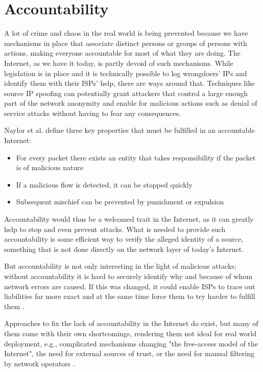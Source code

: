 \documentclass{acm_proc_article-sp}
\begin{document}

\section{Accountability}
\label{sec:acc}
A lot of crime and chaos in the real world is being prevented because we have mechanisms in place that associate distinct persons or groups of persons with actions, making everyone accountable for most of what they are doing. The Internet, as we have it today, is partly devoid of such mechanisms. While legislation is in place and it is technically possible to log wrongdoers' IPs and identify them with their ISPs' help, there are ways around that. Techniques like source IP spoofing can potentially grant attackers that control a large enough part of the network anonymity and enable for malicious actions such as denial of service attacks without having to fear any consequences.

Naylor et al. \cite{apip} define three key properties that must be fulfilled in an accountable Internet:

\begin{itemize}
\item For every packet there exists an entity that takes responsibility if the packet is of malicious nature
\item If a malicious flow is detected, it can be stopped quickly
\item Subsequent mischief can be prevented by punishment or expulsion
\end{itemize}

Accountability would thus be a welcomed trait in the Internet, as it can greatly help to stop and even prevent attacks. What is needed to provide such accountability is some efficient way to verify the alleged identity of a source, something that is not done directly on the network layer of today's Internet. 

But accountability is not only interesting in the light of malicious attacks; without accountability it is hard to securely identify why and because of whom network errors are caused. If this was changed, it could enable ISPs to trace out liabilities far more exact and at the same time force them to try harder to fulfill them \cite{mot}. 

Approaches to fix the lack of accountability in the Internet do exist, but many of them come with their own shortcomings, rendering them not ideal for real world deployment, e.g., complicated mechanisms changing "the free-access model of the Internet", the need for external sources of trust, or the need for manual filtering by network operators \cite{aip}. 
\end{document}
